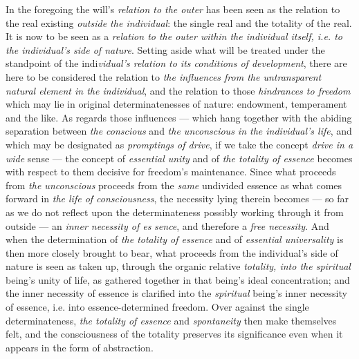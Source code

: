 \documentclass[12pt,a4paper]{book}
\begin{document}
In the foregoing the will's \emph{relation to the outer} has been seen as the
relation to the real existing \emph{outside the individual}: the single real
and the totality of the real. It is now to be seen as a \emph{relation to the
outer within the individual itself, i.e. to the individual's side of nature}.
Setting aside what will be treated under the standpoint of the
indi\emph{vidual's relation to its conditions of development}, there are here
to be considered the relation to \emph{the influences from the untransparent
natural element in the individual}, and the relation to those \emph{hindrances
to freedom} which may lie in original determinatenesses of nature: endowment,
temperament and the like. As regards those influences --- which hang together
with the abiding separation between \emph{the conscious} and \emph{the
unconscious in the individual's life}, and which may be designated as
\emph{promptings of drive}, if we take the concept \emph{drive in a wide}
sense --- the concept of \emph{essential unity} and of \emph{the totality of
essence} becomes with respect to them decisive for freedom's maintenance. Since
what proceeds from \emph{the unconscious} proceeds from the \emph{same}
undivided essence as what comes forward in \emph{the life of consciousness},
the necessity lying therein becomes --- so far as we do not reflect upon the
determinateness possibly working through it from outside --- an \emph{inner
necessity of es}\-%
\emph{sence}, and therefore a \emph{free necessity}. And when the determination
of \emph{the totality of essence} and of \emph{essential universality} is then
more closely brought to bear, what proceeds from the individual's side of
nature is seen as taken up, through the organic relative \emph{totality, into
the spiritual} being's unity of life, as gathered together in that being's
ideal concentration; and the inner necessity of essence is clarified into the
\emph{spiritual} being's inner necessity of essence, i.e. into
essence-determined freedom. Over against the single determinateness, \emph{the
totality of essence} and \emph{spontaneity} then make themselves felt, and the
consciousness of the totality preserves its significance even when it appears
in the form of abstraction.
\end{document}
